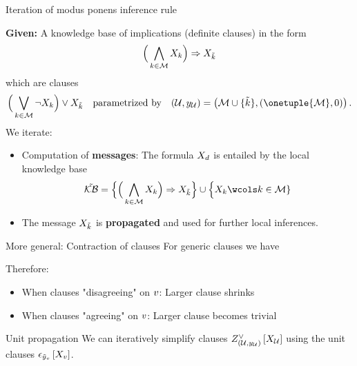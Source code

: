 \documentclass{beamer}
\begin{document}
    \begin{frame}{Iteration of modus ponens inference rule}
        \par
        {\bf Given:} A knowledge base of implications (definite clauses) in the form
        \begin{align*}
            \Big(\bigwedge_{k\in\mathcal{M}}X_{k}\Big)\Rightarrow X_{\tilde{k}}
        \end{align*}
        which are clauses
        \begin{align*}
            \Big(\bigvee_{\catenumerator\in\mathcal{M}}\lnot\catvariableof{\catenumerator}\Big) \lor \catvariableof{\seccatenumerator}
            \quad \text{parametrized by} \quad \hardparam =\big(\mathcal{M}\cup\{\seccatenumerator\},(\onetuple{\mathcal{M}},0)\big)
            \, .
        \end{align*}
        \medskip
        We iterate:
        \begin{itemize}
            \item Computation of {\bf messages}: The formula $X_{d}$ is entailed by the local knowledge base
            \begin{align*}
                \seckb = \Big\{\Big(\bigwedge_{\catenumerator\in\mathcal{M}}\catvariableof{\catenumerator}\Big)\Rightarrow\catvariableof{\seccatenumerator}\Big\}
                \cup \Big\{\catvariableof{\catenumerator} \wcols \catenumerator\in\mathcal{M} \}
            \end{align*}
            \item The message $X_{\tilde{k}}$ is {\bf propagated} and used for further local inferences.
        \end{itemize}



    \end{frame}


    \begin{frame}{More general: Contraction of clauses}
        For generic clauses we have
        
        Therefore:
        \begin{itemize}
            \item When clauses "disagreeing" on $v$: Larger clause shrinks
            \item When clauses "agreeing" on $v$: Larger clause becomes trivial
        \end{itemize}

        \begin{block}{Unit propagation}
            We can iteratively simplify clauses $Z^{\lor}_{(\mathcal{U},y_{\mathcal{U}})}\left[X_{\mathcal{U}}\right]$ using the unit clauses $\epsilon_{\tilde{y}_{v}}\left[X_{v}\right]$.
        \end{block}
    \end{frame}
\end{document}
